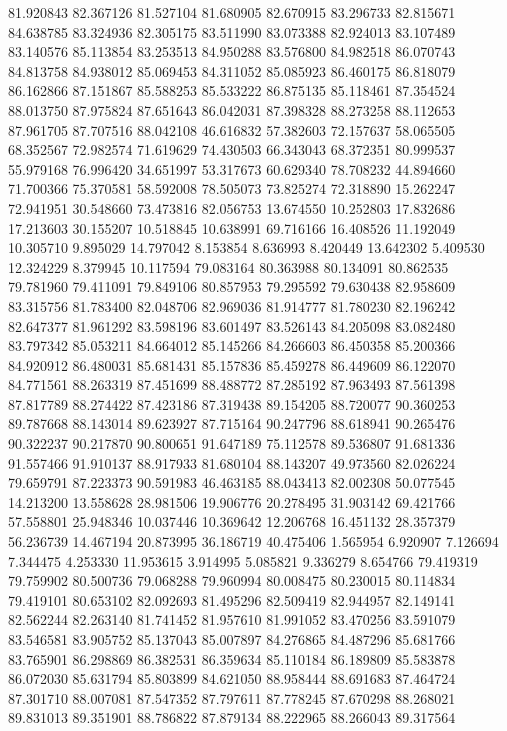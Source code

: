 81.920843
82.367126
81.527104
81.680905
82.670915
83.296733
82.815671
84.638785
83.324936
82.305175
83.511990
83.073388
82.924013
83.107489
83.140576
85.113854
83.253513
84.950288
83.576800
84.982518
86.070743
84.813758
84.938012
85.069453
84.311052
85.085923
86.460175
86.818079
86.162866
87.151867
85.588253
85.533222
86.875135
85.118461
87.354524
88.013750
87.975824
87.651643
86.042031
87.398328
88.273258
88.112653
87.961705
87.707516
88.042108
46.616832
57.382603
72.157637
58.065505
68.352567
72.982574
71.619629
74.430503
66.343043
68.372351
80.999537
55.979168
76.996420
34.651997
53.317673
60.629340
78.708232
44.894660
71.700366
75.370581
58.592008
78.505073
73.825274
72.318890
15.262247
72.941951
30.548660
73.473816
82.056753
13.674550
10.252803
17.832686
17.213603
30.155207
10.518845
10.638991
69.716166
16.408526
11.192049
10.305710
9.895029
14.797042
8.153854
8.636993
8.420449
13.642302
5.409530
12.324229
8.379945
10.117594
79.083164
80.363988
80.134091
80.862535
79.781960
79.411091
79.849106
80.857953
79.295592
79.630438
82.958609
83.315756
81.783400
82.048706
82.969036
81.914777
81.780230
82.196242
82.647377
81.961292
83.598196
83.601497
83.526143
84.205098
83.082480
83.797342
85.053211
84.664012
85.145266
84.266603
86.450358
85.200366
84.920912
86.480031
85.681431
85.157836
85.459278
86.449609
86.122070
84.771561
88.263319
87.451699
88.488772
87.285192
87.963493
87.561398
87.817789
88.274422
87.423186
87.319438
89.154205
88.720077
90.360253
89.787668
88.143014
89.623927
87.715164
90.247796
88.618941
90.265476
90.322237
90.217870
90.800651
91.647189
75.112578
89.536807
91.681336
91.557466
91.910137
88.917933
81.680104
88.143207
49.973560
82.026224
79.659791
87.223373
90.591983
46.463185
88.043413
82.002308
50.077545
14.213200
13.558628
28.981506
19.906776
20.278495
31.903142
69.421766
57.558801
25.948346
10.037446
10.369642
12.206768
16.451132
28.357379
56.236739
14.467194
20.873995
36.186719
40.475406
1.565954
6.920907
7.126694
7.344475
4.253330
11.953615
3.914995
5.085821
9.336279
8.654766
79.419319
79.759902
80.500736
79.068288
79.960994
80.008475
80.230015
80.114834
79.419101
80.653102
82.092693
81.495296
82.509419
82.944957
82.149141
82.562244
82.263140
81.741452
81.957610
81.991052
83.470256
83.591079
83.546581
83.905752
85.137043
85.007897
84.276865
84.487296
85.681766
83.765901
86.298869
86.382531
86.359634
85.110184
86.189809
85.583878
86.072030
85.631794
85.803899
84.621050
88.958444
88.691683
87.464724
87.301710
88.007081
87.547352
87.797611
87.778245
87.670298
88.268021
89.831013
89.351901
88.786822
87.879134
88.222965
88.266043
89.317564
